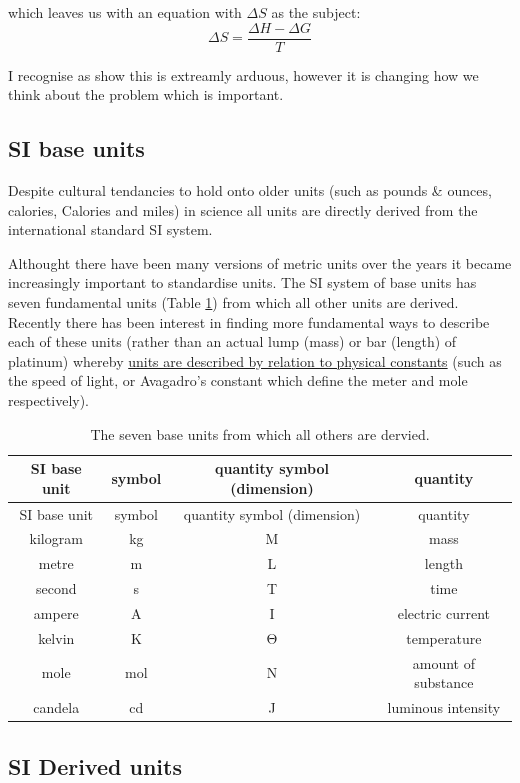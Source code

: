 \documentclass[
]{book}
\begin{document}
which leaves us with an equation with \(\Delta S\) as the subject:
\begin{equation*}
\Delta S = \frac{\Delta H -\Delta G}{T}
\end{equation*}

I recognise as show this is extreamly arduous, however it is changing how we think about the problem which is important.

\hypertarget{si-base-units}{%
\subsection{SI base units}\label{si-base-units}}

Despite cultural tendancies to hold onto older units (such as pounds \& ounces, calories, Calories and miles) in science all units are directly derived from the international standard SI system.

Althought there have been many versions of metric units over the years it became increasingly important to standardise units. The SI system of base units has seven fundamental units (Table \ref{tab:SIbase}) from which all other units are derived. Recently there has been interest in finding more fundamental ways to describe each of these units (rather than an actual lump (mass) or bar (length) of platinum) whereby \href{https://www.npl.co.uk/si-units/the-redefinition-of-the-si-units}{units are described by relation to physical constants} (such as the speed of light, or Avagadro's constant which define the meter and mole respectively).

\begin{longtable}[]{@{}cccc@{}}
\caption{\label{tab:SIbase} The seven base units from which all others are dervied.}\tabularnewline
\toprule
SI base unit & symbol & quantity symbol (dimension) & quantity\tabularnewline
\midrule
\endfirsthead
\toprule
SI base unit & symbol & quantity symbol (dimension) & quantity\tabularnewline
\midrule
\endhead
kilogram & kg & M & mass\tabularnewline
metre & m & L & length\tabularnewline
second & s & T & time\tabularnewline
ampere & A & I & electric current\tabularnewline
kelvin & K & Θ & temperature\tabularnewline
mole & mol & N & amount of substance\tabularnewline
candela & cd & J & luminous intensity\tabularnewline
\bottomrule
\end{longtable}

\hypertarget{si-derived-units}{%
\subsection{SI Derived units}\label{si-derived-units}}
\end{document}
